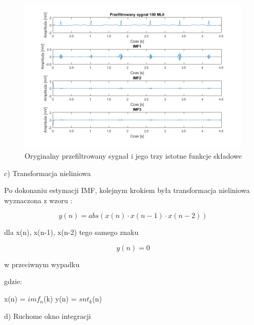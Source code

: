 \documentclass[10pt,a4paper]{article}
\begin{document}
\begin{figure}[h!]
\label{emd}
	\centerline{\includegraphics[width=\textwidth]{drugi}}
	\caption{Oryginalny przefiltrowany sygnał i jego trzy istotne funkcje składowe}
\end{figure}
\FloatBarrier

 \vspace{1em}

c) Transformacja nieliniowa

Po dokonaniu estymacji IMF, kolejnym krokiem była transformacja nieliniowa
wyznaczona z wzoru \cite{trzy}:

\begin{equation}
\label{w9}
y(n) = abs(x(n) \cdot x(n - 1) \cdot x(n - 2))
\end{equation}
\begin{center}

dla x(n), x(n-1), x(n-2) tego samego znaku

\end{center}

\begin{equation}
y(n) = 0 
\label{w9}
\end{equation}

\begin{center}
w przeciwnym wypadku
\end{center}

\vspace{1em}

gdzie:

x(n) = $imf_n$(k)
y(n) = $snt_k$(n)


 \vspace{1em}

d) Ruchome okno integracji
\end{document}
